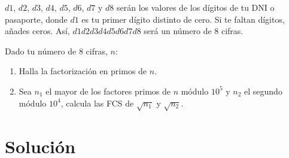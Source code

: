 	$d1$, $d2$, $d3$, $d4$, $d5$, $d6$, $d7$ y $d8$ serán los valores de los dígitos de tu DNI o pasaporte, donde
	$d1$ es tu primer dígito distinto de cero. Si te faltan dígitos, añades ceros. Así, $d1d2d3d4d5d6d7d8$ será
	un número de 8 cifras.
	
	Dado tu número de 8 cifras, $n$:
	\begin{enumerate}
		\item Halla la factorización en primos de $n$.
		\item Sea $n_1$ el mayor de los factores primos de $n$ módulo $10^5$ y $n_2$ el segundo módulo $10^4$,
		calcula las FCS de $\sqrt{n_1}$ y $\sqrt{n_2}$.
	\end{enumerate}

\section*{Solución}
